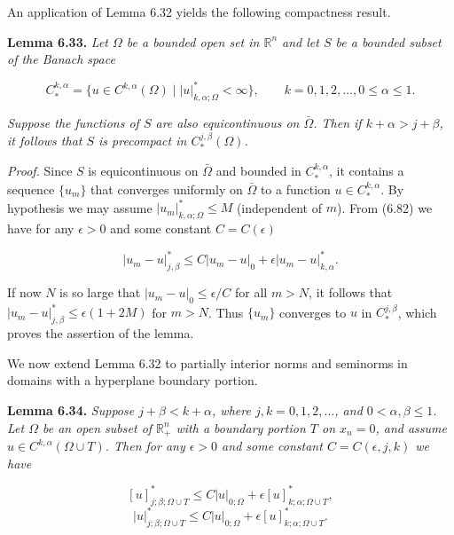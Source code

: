 \medskip

An application of Lemma 6.32 yields the following compactness result.

\medskip

\noindent \textbf{Lemma 6.33.} \textit{Let $\Omega$ be a bounded open set in $\mathbb{R}^n$ and let $S$ be a bounded subset of
the Banach space}

\[
C_*^{k,\alpha}=\{u\in C^{k,\alpha}(\Omega)\mid \lvert u\rvert^*_{k,\alpha;\Omega}<\infty\}, \qquad k=0,1,2,\dots, 0\leq \alpha\leq 1.
\]

\noindent \textit{Suppose the functions of $S$ are also equicontinuous on $\bar{\Omega}$. Then if $k+\alpha>j+\beta$, it
follows that $S$ is precompact in $C_*^{j,\beta}(\Omega)$.}

\medskip

\noindent \textit{Proof.} Since $S$ is equicontinuous on $\bar{\Omega}$ and bounded in $C_*^{k,\alpha}$, it contains a sequence
$\{u_m\}$ that converges uniformly on $\bar{\Omega}$ to a function $u\in C_*^{k,\alpha}$. By hypothesis we may
assume $\lvert u_m\rvert^*_{k,\alpha;\Omega}\leq M$ (independent of $m$). From (6.82) we have for any $\epsilon>0$ and
some constant $C=C(\epsilon)$

\[
\lvert u_m-u\rvert^*_{j,\beta}\leq C\lvert u_m-u\rvert_{0}+\epsilon \lvert u_m-u\rvert^*_{k,\alpha}.
\]

If now $N$ is so large that $\lvert u_m-u\rvert_{0}\leq \epsilon/C$ for all $m>N$, it follows that
$\lvert u_m-u\rvert^*_{j,\beta}\leq \epsilon(1+2M)$ for $m>N$. Thus $\{u_m\}$ converges to $u$ in $C_*^{j,\beta}$, which proves the assertion
of the lemma.

\medskip

We now extend Lemma 6.32 to partially interior norms and seminorms in
domains with a hyperplane boundary portion.




\noindent \textbf{Lemma 6.34.} \textit{Suppose $j+\beta<k+\alpha$, where $j,k=0,1,2,\dots$, and $0<\alpha,\beta\leq 1$.
Let $\Omega$ be an open subset of $\mathbb{R}_+^n$ with a boundary portion $T$ on $x_n=0$, and assume
$u\in C^{k,\alpha}(\Omega\cup T)$. Then for any $\epsilon>0$ and some constant $C=C(\epsilon,j,k)$ we have}

\begin{equation}
\tag{6.89}
[u]^*_{j;\beta;\Omega\cup T}\leq C|u|_{0;\Omega}+\epsilon [u]^*_{k;\alpha;\Omega\cup T},
\end{equation}
\[
|u|^*_{j;\beta;\Omega\cup T}\leq C|u|_{0;\Omega}+\epsilon [u]^*_{k;\alpha;\Omega\cup T}.
\]

